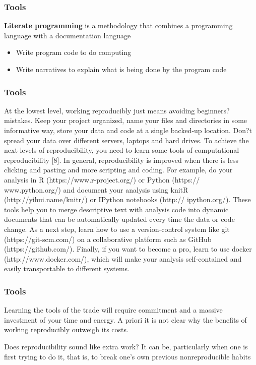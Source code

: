 \documentclass{beamer}
\begin{document}
\begin{frame}
\frametitle{Tools}
{\bf Literate programming} is a methodology that combines a programming language with a documentation language\\ 
\begin{itemize}
    \item Write program code to do computing
    \item Write narratives to explain what is being done by the program code
\end{itemize}
\end{frame}


\begin{frame}
\frametitle{Tools}
At the lowest level, working reproducibly just means avoiding beginners? mistakes. Keep your project organized, name your files and directories in some informative way, store your data and code at a single backed-up location. Don?t spread your data over different servers, laptops and hard drives.
To achieve the next levels of reproducibility, you need to learn some tools of computational reproducibility [8]. In general, reproducibility is improved when there is less clicking and pasting and more scripting and coding. For example, do your analysis in R (https://www.r-project.org/) or Python (https:// www.python.org/) and document your analysis using knitR (http://yihui.name/knitr/) or IPython notebooks (http:// ipython.org/). These tools help you to merge descriptive text with analysis code into dynamic documents that can be automatically updated every time the data or code change.
As a next step, learn how to use a version-control system like git (https://git-scm.com/) on a collaborative platform such as GitHub (https://github.com/). Finally, if you want to become a pro, learn to use docker (http://www.docker.com/), which will make your analysis self-contained and easily transportable to different systems.
\end{frame}


\begin{frame}
\frametitle{Tools}


Learning the tools of the trade will require commitment and a massive investment of your time and energy. A priori it is not clear why the benefits of working reproducibly outweigh its costs.

Does reproducibility sound like extra work? It can be, particularly when one is first trying to do it, that is, to break one's own previous nonreproducible habits


\end{frame}
\end{document}
